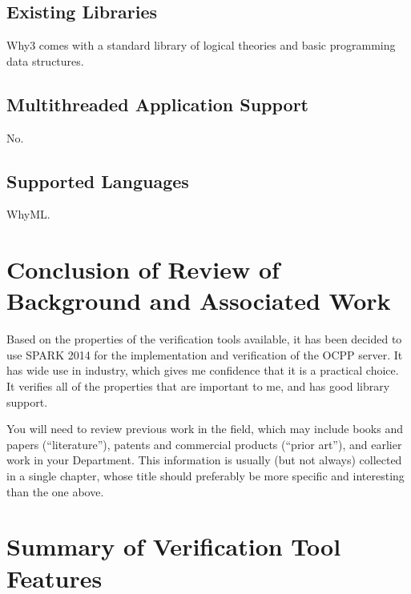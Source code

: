 \documentclass[12pt,openany,a4paper]{book}
\begin{document}
	\subsection{Existing Libraries}
	Why3 comes with a standard library of logical theories and basic programming data structures.
	\subsection{Multithreaded Application Support}
	No.
	\subsection{Supported Languages}
	WhyML.

\section{Conclusion of Review of Background and Associated Work}
Based on the properties of the verification tools available, it has been decided to use SPARK 2014 for the implementation and verification of the OCPP server. It has wide use in industry, which gives me confidence that it is a practical choice. It verifies all of the properties that are important to me, and has good library support.



You will need to review previous work in the field, which may include
books and papers (``literature''), patents and commercial products
(``prior art''), and earlier work in your Department.  This
information is usually (but not always) collected in a single chapter,
whose title should preferably be more specific and interesting than
the one above.

\section{Summary of Verification Tool Features}
\end{document}

